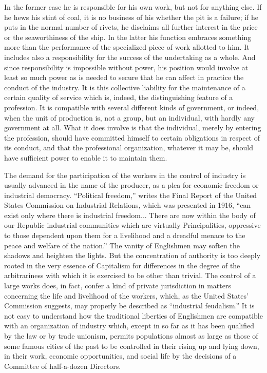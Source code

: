 \documentclass{book}
\begin{document}
In the former case he is responsible for his own work, but not for anything else. If he hews his stint of coal, it is no business of his whether the pit is a failure; if he puts in the normal number of rivets, he disclaims all further interest in the price or the seaworthiness of the ship. In the latter his function embraces something more than the performance of the specialized piece of work allotted to him. It includes also a responsibility for the success of the undertaking as a whole. And since responsibility is impossible without power, his position would involve at least so much power as is needed to secure that he can affect in practice the conduct of the industry. It is this collective liability for the maintenance of a certain quality of service which is, indeed, the distinguishing feature of a profession. It is compatible with several different kinds of government, or indeed, when the unit of production is, not a group, but an individual, with hardly any government at all. What it does involve is that the individual, merely by entering the profession, should have committed himself to certain obligations in respect of its conduct, and that the professional organization, whatever it may be, should have sufficient power to enable it to maintain them.

The demand for the participation of the workers in the control of industry is usually advanced in the name of the producer, as a plea for economic freedom or industrial democracy. “Political freedom,” writes the Final Report of the United States Commission on Industrial Relations, which was presented in 1916, “can exist only where there is industrial freedom... There are now within the body of our Republic industrial communities which are virtually Principalities, oppressive to those dependent upon them for a livelihood and a dreadful menace to the peace and welfare of the nation.” The vanity of Englishmen may soften the shadows and heighten the lights. But the concentration of authority is too deeply rooted in the very essence of Capitalism for differences in the degree of the arbitrariness with which it is exercised to be other than trivial. The control of a large works does, in fact, confer a kind of private jurisdiction in matters concerning the life and livelihood of the workers, which, as the United States’ Commission suggests, may properly be described as “industrial feudalism.” It is not easy to understand how the traditional liberties of Englishmen are compatible with an organization of industry which, except in so far as it has been qualified by the law or by trade unionism, permits populations almost as large as those of some famous cities of the past to be controlled in their rising up and lying down, in their work, economic opportunities, and social life by the decisions of a Committee of half-a-dozen Directors.
\end{document}
